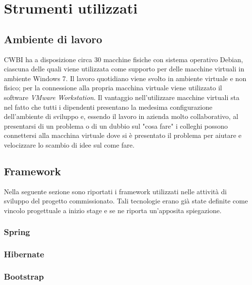 \chapter{Strumenti utilizzati}
\label{cap:strumenti-utilizzati}


\setlength{\parskip}{3ex}

\section{Ambiente di lavoro}
CWBI ha a disposizione circa 30 macchine fisiche con sistema operativo Debian, ciascuna delle quali viene utilizzata come supporto per delle macchine virtuali in ambiente Windows 7. Il lavoro quotidiano viene svolto in ambiente virtuale e non fisico; per la connessione alla propria macchina virtuale viene utilizzato il software \textit{VMware Workstation}. Il vantaggio nell'utilizzare macchine virtuali sta nel fatto che tutti i dipendenti presentano la medesima configurazione dell'ambiente di sviluppo e, essendo il lavoro in azienda molto collaborativo, al presentarsi di un problema o di un dubbio sul "cosa fare" i colleghi possono connettersi alla macchina virtuale dove si è presentato il problema per aiutare e velocizzare lo scambio di idee sul come fare.

\section{Framework}
Nella seguente sezione sono riportati i framework utilizzati nelle attività di sviluppo del progetto commissionato. Tali tecnologie erano già state definite come vincolo progettuale a inizio stage e se ne riporta un'apposita spiegazione.

\subsection{Spring}


\subsection{Hibernate}


\subsection{Bootstrap}


